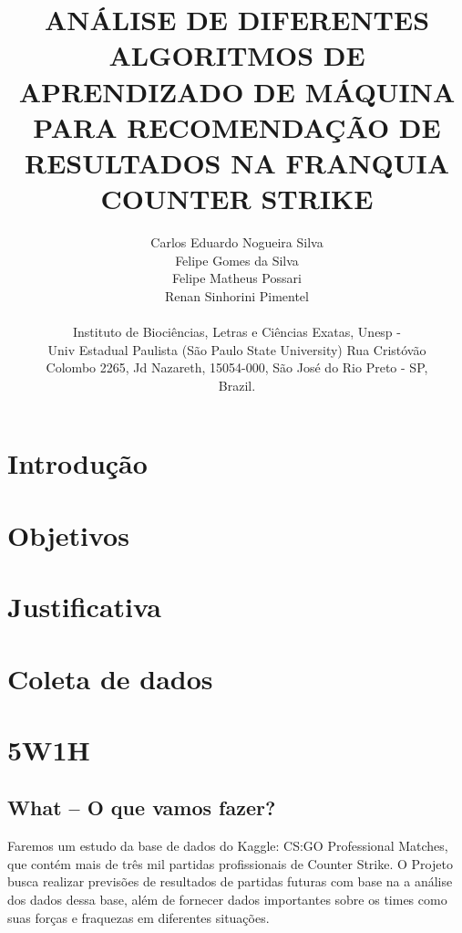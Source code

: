\documentclass[a4paper,times,12pt]{article}
\begin{document}
\title{ANÁLISE DE DIFERENTES ALGORITMOS DE APRENDIZADO DE MÁQUINA PARA RECOMENDAÇÃO DE RESULTADOS NA FRANQUIA COUNTER STRIKE}
\author{Carlos Eduardo Nogueira Silva\\Felipe Gomes da Silva \\Felipe Matheus Possari\\Renan Sinhorini Pimentel\\ \\Instituto de Bioci\^{e}ncias, Letras e Ci\^{e}ncias Exatas, Unesp - \\ Univ Estadual Paulista (S\~{a}o Paulo State University) Rua Crist\'{o}v\~{a}o \\ Colombo 2265, Jd Nazareth, 15054-000, S\~{a}o Jos\'{e} do Rio Preto - SP, \\ Brazil.}
\maketitle

\section{Introdução}
\hspace{+15pt} 

\section{Objetivos}
\hspace{+15pt}

\section{Justificativa}
\hspace{+15pt}

\section{Coleta de dados}
\hspace{+15pt}

\section{5W1H}
\subsection{What – O que vamos fazer?}
\hspace{+15pt}
Faremos um estudo da base de dados do Kaggle: CS:GO Professional Matches, que contém mais de três mil partidas profissionais de Counter Strike. 
O Projeto busca realizar previsões de resultados de partidas futuras com base na a análise dos dados dessa base, além de fornecer dados importantes sobre os times como suas forças e fraquezas em diferentes situações.
\end{document}
